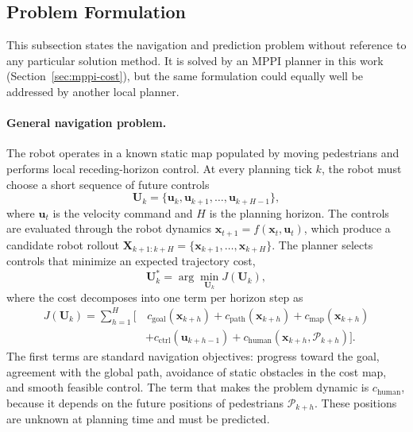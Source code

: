 \documentclass[12pt, a4paper]{article}
\begin{document}
\subsection{Problem Formulation}
\label{sec:problem}

This subsection states the navigation and prediction problem without reference to any particular solution method. It is solved by an MPPI planner in this work (Section~\ref{sec:mppi-cost}), but the same formulation could equally well be addressed by another local planner.

\paragraph{General navigation problem.} The robot operates in a known static map populated by moving pedestrians and performs local receding-horizon control. At every planning tick $k$, the robot must choose a short sequence of future controls
\[
\mathbf{U}_{k}
=
\{\mathbf{u}_{k},\mathbf{u}_{k+1},\ldots,\mathbf{u}_{k+H-1}\},
\]
where $\mathbf{u}_{t}$ is the velocity command and $H$ is the planning horizon. The controls are evaluated through the robot dynamics $\mathbf{x}_{t+1}=f(\mathbf{x}_{t},\mathbf{u}_{t})$, which produce a candidate robot rollout $\mathbf{X}_{k+1:k+H}=\{\mathbf{x}_{k+1},\ldots,\mathbf{x}_{k+H}\}$. The planner selects controls that minimize an expected trajectory cost,
\[
\mathbf{U}^{*}_{k}
=
\arg\min_{\mathbf{U}_{k}}
J(\mathbf{U}_{k}),
\]
where the cost decomposes into one term per horizon step as
\begin{align*}
J(\mathbf{U}_{k})
=
\sum_{h=1}^{H}
\Big[
&\,c_{\mathrm{goal}}(\mathbf{x}_{k+h})
+c_{\mathrm{path}}(\mathbf{x}_{k+h})
+c_{\mathrm{map}}(\mathbf{x}_{k+h})\\
&+c_{\mathrm{ctrl}}(\mathbf{u}_{k+h-1})
+c_{\mathrm{human}}(\mathbf{x}_{k+h},\mathcal{P}_{k+h})
\Big].
\end{align*}
The first terms are standard navigation objectives: progress toward the goal, agreement with the global path, avoidance of static obstacles in the cost map, and smooth feasible control. The term that makes the problem dynamic is $c_{\mathrm{human}}$, because it depends on the future positions of pedestrians $\mathcal{P}_{k+h}$. These positions are unknown at planning time and must be predicted.
\end{document}
